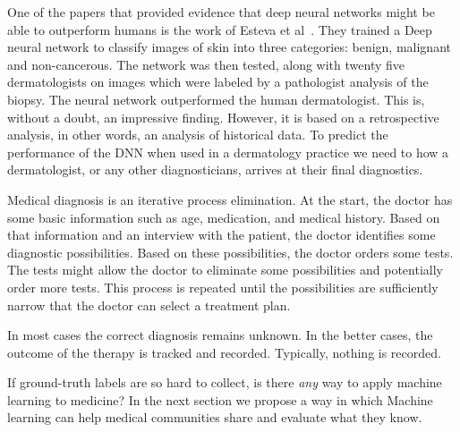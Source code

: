 \documentclass[fleqn,10pt]{wlscirep}
\begin{document}
One of the papers that provided evidence that deep neural networks might be able to outperform humans is the work of Esteva et al~\cite{esteva2017dermatologist}. They trained a Deep neural network to classify images of skin into three categories: benign, malignant and non-cancerous. The network was then tested, along with twenty five dermatologists on images which were labeled by a pathologist analysis of the biopsy. The neural network outperformed the human dermatologist. This is, without a doubt, an impressive finding. However, it is based on a retrospective analysis, in other words, an analysis of historical data. To predict the performance of the DNN when used in a dermatology practice we need to how a dermatologist, or any other diagnosticians, arrives at their final diagnostics.

Medical diagnosis is an iterative process elimination. At the start, the doctor has some basic information such as age, medication, and medical history. Based on that information and an interview with the patient, the doctor identifies some diagnostic possibilities. Based on these possibilities, the doctor orders some tests. The tests might allow the doctor to eliminate some possibilities and potentially order more tests. This process is repeated until the possibilities are sufficiently narrow that the doctor can select a treatment plan. 

In most cases the correct diagnosis remains unknown. In the better cases, the outcome of the therapy is tracked and recorded. Typically, nothing is recorded.

If ground-truth labels are so hard to collect, is there {\em any} way to apply machine learning to medicine?
In the next section we propose a way in which  Machine learning can help medical communities
share and evaluate what they know.
\end{document}
